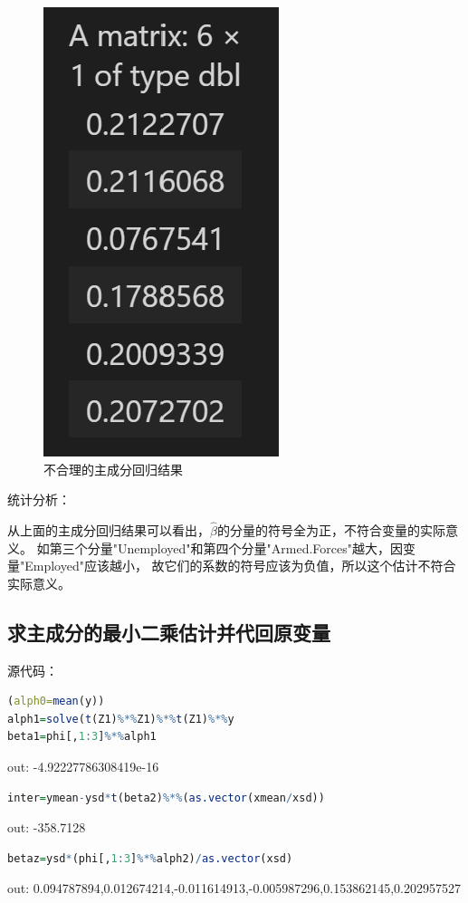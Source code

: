 \documentclass[a4paper,12pt]{article}
\begin{document}
\begin{figure}[htbp]
	\centering
	\includegraphics[scale=0.48]{jietu0.png}
	\caption{不合理的主成分回归结果}
\end{figure}

统计分析：

从上面的主成分回归结果可以看出，$\hat{\beta}$的分量的符号全为正，不符合变量的实际意义。
如第三个分量"Unemployed"和第四个分量"Armed.Forces"越大，因变量"Employed"应该越小，
故它们的系数的符号应该为负值，所以这个估计不符合实际意义。

\subsection{求主成分的最小二乘估计并代回原变量}

源代码：

\begin{lstlisting}[language=r,breaklines]
(alph0=mean(y))
alph1=solve(t(Z1)%*%Z1)%*%t(Z1)%*%y
beta1=phi[,1:3]%*%alph1
\end{lstlisting}
out: -4.92227786308419e-16


\begin{lstlisting}[language=r,breaklines]
inter=ymean-ysd*t(beta2)%*%(as.vector(xmean/xsd))
\end{lstlisting}
out: -358.7128

\begin{lstlisting}[language=r,breaklines]
betaz=ysd*(phi[,1:3]%*%alph2)/as.vector(xsd)
\end{lstlisting}
out: 0.094787894,0.012674214,-0.011614913,-0.005987296,0.153862145,0.202957527
\end{document}
